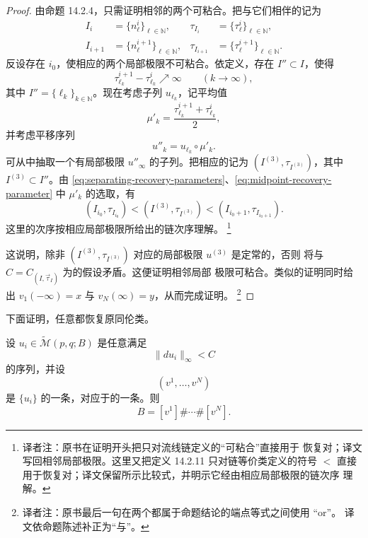 \begin{proof}
由命题 14.2.4，只需证明相邻的两个\termLocalLimit{}可粘合。把与它们相伴的\termRecoveringPair{}记为
\[
  \begin{aligned}
  I_i&=\{n_\ell^i\}_{\ell\in\mathbb N},
  &\tau_{I_i}&=\{\tau_\ell^i\}_{\ell\in\mathbb N},\\
  I_{i+1}&=\{n_\ell^{i+1}\}_{\ell\in\mathbb N},
  &\tau_{I_{i+1}}&=\{\tau_\ell^{i+1}\}_{\ell\in\mathbb N}.
  \end{aligned}
\]
反设存在 $i_0$，使相应的两个局部极限不可粘合。依定义，存在
$I''\subset I$，使得
\begin{equation}
  \tau_{\ell_k}^{i+1}-\tau_{\ell_k}^{i}
  \nearrow\infty
  \qquad(k\to\infty),
\label{eq:separating-recovery-parameters}
\end{equation}
其中 $I''=\{\ell_k\}_{k\in\mathbb N}$。现在考虑子列 $u_{\ell_k}$，记平均值
\begin{equation}
  \mu'_k
  =
  \frac{\tau_{\ell_k}^{i+1}+\tau_{\ell_k}^{i}}2,
\label{eq:midpoint-recovery-parameter}
\end{equation}
并考虑平移序列
\[
  u''_k=u_{\ell_k}\circ\mu'_k.
\]
可从中抽取一个有局部极限 $u''_\infty$ 的子列。把相应的\termRecoveringPair{}记为
$(I^{(3)},\tau_{I^{(3)}})$，其中 $I^{(3)}\subset I''$。由
\eqref{eq:separating-recovery-parameters}、\eqref{eq:midpoint-recovery-parameter}
中 $\mu'_k$ 的选取，有
\[
  (I_{i_0},\tau_{I_{i_0}})
  <(I^{(3)},\tau_{I^{(3)}})
  <(I_{i_0+1},\tau_{I_{i_0+1}}).
\]
这里的次序按相应局部极限所给出的链次序理解。
\footnote{译者注：原书在证明开头把只对\personFloer{}流线链定义的“可粘合”直接用于
恢复对；译文写回相邻局部极限。这里又把定义 14.2.11 只对链等价类定义的符号
$<$ 直接用于恢复对；译文保留所示比较式，并明示它经由相应局部极限的链次序
理解。}

这说明，除非 $(I^{(3)},\tau_{I^{(3)}})$ 对应的局部极限 $u^{(3)}$ 是定常的，否则
将与 $C=C_{(I,\vec\tau_I)}$ 为\termMaximalChain{}的假设矛盾。这便证明相邻局部
极限可粘合。类似的证明同时给出
$v_1(-\infty)=x$ 与 $v_N(\infty)=y$，从而完成证明。
\footnote{译者注：原书最后一句在两个都属于命题结论的端点等式之间使用 “or”。
译文依命题陈述补正为“与”。}
\end{proof}

下面证明，任意\termMaximalChain{}都恢复原同伦类。

\begin{theorem}
\label{thm:maximal-chain-recovers-homotopy-class}
设 $u_i\in\widetilde{\mathcal M}(p,q;B)$ 是任意满足
\[
  \|du_i\|_\infty<C
\]
的序列，并设
\[
  (v^1,\ldots,v^N)
\]
是 $\{u_i\}$ 的一条\termLocalLimitChain{}，对应于\termRecoveringSequence{}的一条\termMaximalChain{}。则
\begin{equation}
  B=[v^1]\#\cdots\#[v^N].
\label{eq:maximal-chain-homotopy-class}
\end{equation}
\end{theorem}

